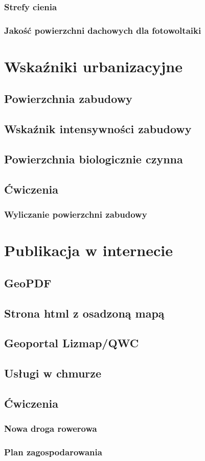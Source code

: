 \documentclass[a4paper,11pt, onecolumn, openany]{memoir}
\begin{document}
\subsection{Strefy cienia}
\subsection{Jakość powierzchni dachowych dla fotowoltaiki}

\chapter{Wskaźniki urbanizacyjne}
\section{Powierzchnia zabudowy}
\section{Wskaźnik intensywności zabudowy}
\section{Powierzchnia biologicznie czynna}
\section{Ćwiczenia}
\subsection{Wyliczanie powierzchni zabudowy}

\chapter{Publikacja w internecie}
\section{GeoPDF}
\section{Strona html z osadzoną mapą}
\section{Geoportal Lizmap/QWC}
\section{Usługi w chmurze}
\section{Ćwiczenia}
\subsection{Nowa droga rowerowa}
\subsection{Plan zagospodarowania} 
\backmatter	

\tableofcontents*
\clearpage



\end{document}

